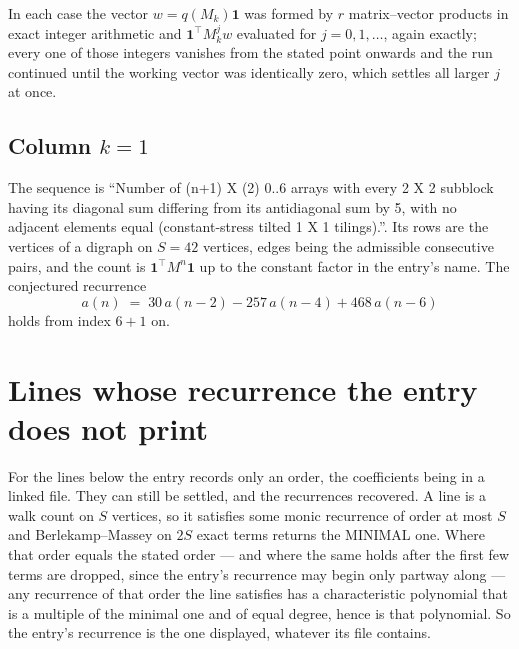 \documentclass[11pt,a4paper]{article}
\theoremstyle{plain}
\theoremstyle{definition}
\begin{document}
In each case the vector $w=q(M_k)\mathbf{1}$ was formed by $r$ matrix--vector products in
exact integer arithmetic and $\mathbf{1}^{\!\top}M_k^{j}w$ evaluated for $j=0,1,\dots$,
again exactly; every one of those integers vanishes from the stated point onwards and the run
continued until the working vector was identically zero, which settles all larger $j$ at once.

\subsection*{Column $k$$=1$}
The sequence is ``Number of (n+1) X (2) 0..6 arrays with every 2 X 2 subblock having its diagonal sum differing from its antidiagonal sum by 5, with no adjacent elements equal (constant-stress tilted 1 X 1 tilings).''. Its rows are the vertices of a digraph on
$S=42$ vertices, edges being the admissible consecutive pairs, and the count is
$\mathbf{1}^{\!\top}M^{n}\mathbf{1}$ up to the constant factor in the entry's name.
The conjectured recurrence
\[
a(n)\;=\;30\,a(n-2) - 257\,a(n-4) + 468\,a(n-6)
\]
holds from index $6+1$ on.


\section{Lines whose recurrence the entry does not print}

For the lines below the entry records only an order, the coefficients being in a linked file.
They can still be settled, and the recurrences recovered. A line is a walk count on $S$
vertices, so it satisfies some monic recurrence of order at most $S$ and Berlekamp--Massey on
$2S$ exact terms returns the MINIMAL one. Where that order equals the stated order --- and
where the same holds after the first few terms are dropped, since the entry's recurrence may
begin only partway along --- any recurrence of that order the line satisfies has a
characteristic polynomial that is a multiple of the minimal one and of equal degree, hence is
that polynomial. So the entry's recurrence is the one displayed, whatever its file contains.
\end{document}
